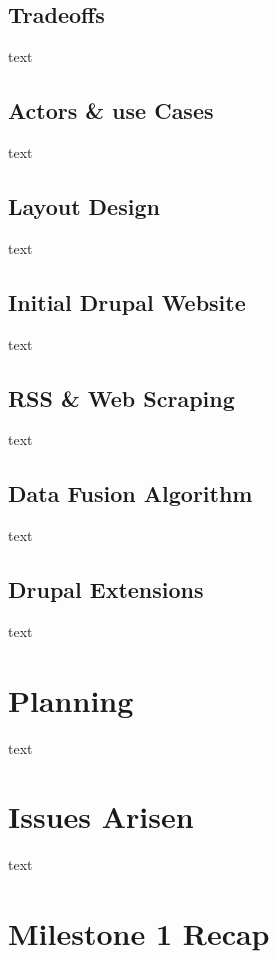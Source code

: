 \documentclass[12pt]{article} %
\begin{document}
\subsection{Tradeoffs}

text

\subsection{Actors \& use Cases}

text

\subsection{Layout Design}

text

\subsection{Initial Drupal Website}

text

\subsection{RSS \& Web Scraping}

text

\subsection{Data Fusion Algorithm}

text

\subsection{Drupal Extensions}

text

\section{Planning}

text

\section{Issues Arisen}

text

\section{Milestone 1 Recap}
\end{document}
